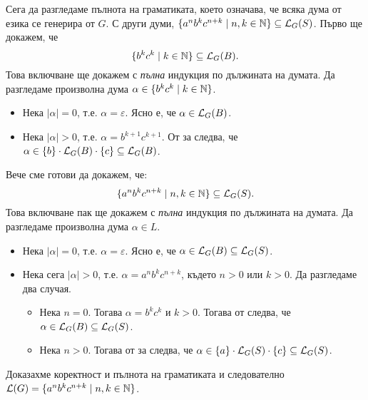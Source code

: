 \begin{extra}
\begin{example}
    Сега да разгледаме пълнота на граматиката, което означава, че
    всяка дума от езика се генерира от $G$. С други думи, $\{a^nb^kc^{n+k} \mid n,k\in\mathbb{N}\} \subseteq \mathcal{L}_G(S)$.
    Първо ще докажем, че
    \begin{equation}
      \label{eq:4}
      \{b^kc^k \mid k \in \mathbb{N}\} \subseteq \mathcal{L}_G(B).
    \end{equation}
    Това включване ще докажем с \emph{пълна} индукция по дължината на думата.
    Да разгледаме произволна дума $\alpha \in \{b^kc^k \mid k \in \mathbb{N}\}$.
    \begin{itemize}
    \item
      Нека $|\alpha| = 0$, т.е. $\alpha = \varepsilon$.
      Ясно е, че $\alpha \in \mathcal{L}_G(B)$.
    \item
      Нека $|\alpha| > 0$, т.е. $\alpha = b^{k+1}c^{k+1}$.
      От \IndHyp за  следва, че $\alpha \in \{b\} \cdot \mathcal{L}_G(B) \cdot \{c\} \subseteq \mathcal{L}_G(B)$.
    \end{itemize}
    Вече сме готови да докажем, че:
    \begin{equation}
      \label{eq:9}
      \{a^nb^kc^{n+k} \mid n,k \in \mathbb{N}\} \subseteq \mathcal{L}_G(S).
    \end{equation}
    Това включване пак ще докажем с \emph{пълна} индукция по дължината на думата.
    Да разгледаме произволна дума $\alpha \in L$. 
    \begin{itemize}
    \item
      Нека $|\alpha| = 0$, т.е. $\alpha = \varepsilon$.
      Ясно е, че $\alpha \in \mathcal{L}_G(B) \subseteq \mathcal{L}_G(S)$.
    \item
      Нека сега $|\alpha| > 0$, т.е. $\alpha = a^nb^kc^{n+k}$, където $n > 0$ или $k > 0$. Да разгледаме два случая.
      \begin{itemize}
      \item
        Нека $n = 0$. Тогава $\alpha = b^kc^k$ и $k > 0$. Тогава от 
        следва, че $\alpha \in \mathcal{L}_G(B) \subseteq \mathcal{L}_G(S)$.
      \item                   
        Нека $n > 0$. Тогава от \IndHyp за  следва, че
        $\alpha \in \{a\} \cdot \mathcal{L}_G(S) \cdot \{c\} \subseteq \mathcal{L}_G(S)$.
      \end{itemize}
    \end{itemize}
    Доказахме коректност и пълнота на граматиката и следователно $\mathcal{L}(G) = \{a^nb^kc^{n+k} \mid n,k\in\mathbb{N}\}$.
  \end{example}
  

\end{extra}

